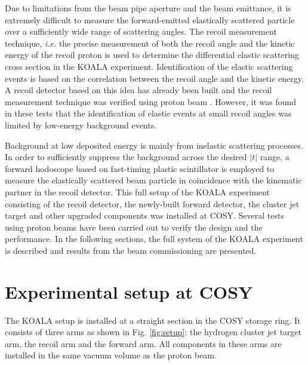 \documentclass[number,5p]{elsarticle}
\begin{document}
Due to limitations from the beam pipe aperture and the beam emittance,
it is extremely difficult to measure the forward-emitted elastically scattered
particle over a sufficiently wide range of scattering angles.
The recoil measurement technique, \textit{i.e.} the precise measurement of both the recoil angle and the kinetic energy of the recoil proton is used to determine the differential elastic scattering cross section in the
KOALA experiment.
Identification of the elastic scattering events is based on the correlation between the recoil angle and the kinetic energy.
A recoil detector based on this idea has already been built and the recoil measurement technique was verified using proton beam
\cite{koala_article,recoil_article}.
However, it was found in these tests that the identification of elastic events at small recoil angles was limited by low-energy background events.

Background at low deposited energy is mainly from inelastic scattering processes.
In order to sufficiently suppress the background across the desired $|t|$ range,
a forward hodoscope based on fast-timing plastic scintillator is employed
to measure the elastically scattered beam particle in coincidence with the kinematic partner in the recoil detector.
This full setup of the KOALA experiment consisting of the recoil detector, the newly-built
forward detector, the cluster jet target and other upgraded components was installed at COSY.
Several tests using proton beams have been carried out to verify the design and the performance.
In the following sections,  the full system of the KOALA experiment is described and results from the beam commissioning are presented.

\section{Experimental setup at COSY}
\label{sec:setup}

The KOALA setup is installed at a straight section in the COSY storage ring.
It consists of three arms as shown in Fig. \ref{fig:setup}: the hydrogen
cluster jet target arm, the recoil arm and the forward arm.
All components in these arms are installed in the same vacuum volume as the
proton beam.
\end{document}
